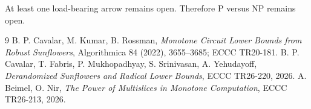 \documentclass[11pt]{article}
\begin{document}
At least one load-bearing arrow remains open. Therefore P versus NP remains open.

\begin{thebibliography}{9}
 B. P. Cavalar, M. Kumar, B. Rossman, \emph{Monotone Circuit Lower Bounds from Robust Sunflowers}, Algorithmica 84 (2022), 3655--3685; ECCC TR20-181.
 B. P. Cavalar, T. Fabris, P. Mukhopadhyay, S. Srinivasan, A. Yehudayoff, \emph{Derandomized Sunflowers and Radical Lower Bounds}, ECCC TR26-220, 2026.
 A. Beimel, O. Nir, \emph{The Power of Multislices in Monotone Computation}, ECCC TR26-213, 2026.
\end{thebibliography}
\end{document}
